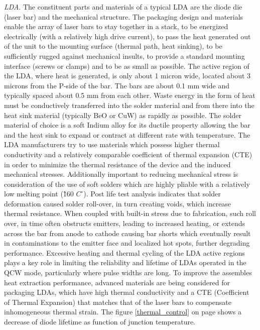 \textit{\acs{LDA}}.
The constituent parts and materials of a typical \acs{LDA} are the diode die (laser bar) and the mechanical structure. The packaging design and materials enable the array of laser bars to stay together in a stack, to be energized electrically (with a relatively high drive current), to pass the heat generated out of the unit to the mounting surface (thermal path, heat sinking), to be sufficiently rugged against mechanical insults, to provide a standard mounting interface (screws or clamps) and to be as small as possible. The active region of the \acs{LDA}, where heat is generated, is only about 1 micron wide, located about 3 microns from the P-side of the bar. The bars are about 0.1 mm wide and typically spaced about 0.5 mm from each other. Waste energy in the form of heat must be conductively transferred into the solder material and from there into the heat sink material (typically BeO or CuW) as rapidly as possible. The solder material of choice is a soft Indium alloy for its ductile property allowing the bar and the heat sink to expand or contract at different rate with temperature. The \acs{LDA} manufacturers try to use materials which possess higher thermal conductivity and a relatively comparable coefficient of thermal expansion (CTE) in order to minimize the thermal resistance of the device and the induced mechanical stresses. Additionally important to reducing mechanical stress is consideration of the use of soft solders which are highly pliable with a relatively low melting point (\~ 160 $C^{\circ}$). Post life test analysis indicates that solder deformation caused solder roll-over, in turn creating voids, which increase thermal resistance. When coupled with built-in stress due to fabrication, such roll over, in time often obstructs emitters, leading to increased heating, or extends across the bar from anode to cathode causing bar shorts which eventually result in contaminations to the emitter face and localized hot spots, further degrading performance. Excessive heating and thermal cycling of the \acs{LDA} active regions plays a key role in limiting the reliability and lifetime of \acp{LDA} operated in the QCW mode, particularly where pulse widths are long. To improve the assembles heat extraction performance, advanced materials are being considered for packaging \acp{LDA}, which have high thermal conductivity and a CTE (Coefficient of Thermal Expansion) that matches that of the laser bars to compensate inhomogeneous thermal strain. The figure \ref{thermal_control} on page \pageref{thermal_control} shows a decrease of diode lifetime as function of junction temperature.

